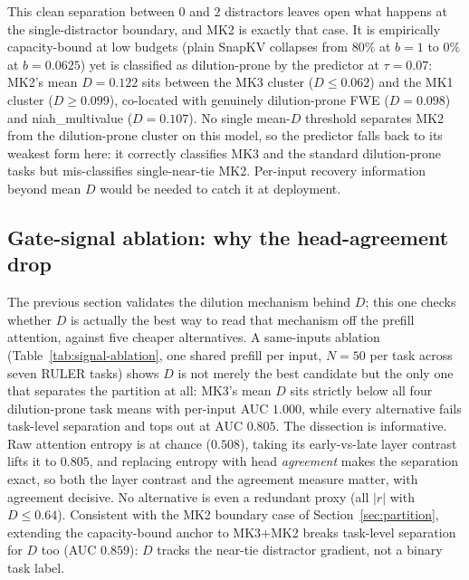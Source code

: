 This clean separation between $0$ and $2$ distractors leaves open what
happens at the single-distractor boundary, and MK2 is exactly that case.
It is empirically capacity-bound at low budgets (plain SnapKV collapses
from $80\%$ at $b{=}1$ to $0\%$ at $b{=}0.0625$) yet is classified as
dilution-prone by the predictor at $\tau = 0.07$: MK2's mean $D = 0.122$
sits between the MK3 cluster ($D \leq 0.062$) and the MK1 cluster ($D
\geq 0.099$), co-located with genuinely dilution-prone FWE ($D = 0.098$)
and niah\_multivalue ($D = 0.107$). No single mean-$D$ threshold
separates MK2 from the dilution-prone cluster on this model, so the
predictor falls back to its weakest form here: it correctly classifies
MK3 and the standard dilution-prone tasks but mis-classifies single-near-tie
MK2. Per-input recovery information beyond mean $D$ would be needed to
catch it at deployment.

\subsection{Gate-signal ablation: why the head-agreement drop}

The previous section validates the dilution mechanism behind $D$; this
one checks whether $D$ is actually the best way to read that mechanism
off the prefill attention, against five cheaper alternatives. A
same-inputs ablation (Table~\ref{tab:signal-ablation}, one shared
prefill per input, $N = 50$ per task across seven RULER tasks) shows $D$
is not merely the best candidate but the only one that separates the
partition at all: MK3's mean $D$ sits strictly below all four
dilution-prone task means with per-input AUC $1.000$, while every
alternative fails task-level separation and tops out at AUC $0.805$.
The dissection is informative. Raw attention entropy is at chance
($0.508$), taking its early-vs-late layer contrast lifts it to $0.805$,
and replacing entropy with head \emph{agreement} makes the separation
exact, so both the layer contrast and the agreement measure matter,
with agreement decisive. No alternative is even a redundant proxy (all
$|r|$ with $D \le 0.64$). Consistent with the MK2 boundary case of
Section~\ref{sec:partition}, extending the capacity-bound anchor to
MK3$+$MK2 breaks task-level separation for $D$ too (AUC $0.859$): $D$
tracks the near-tie distractor gradient, not a binary task label.

